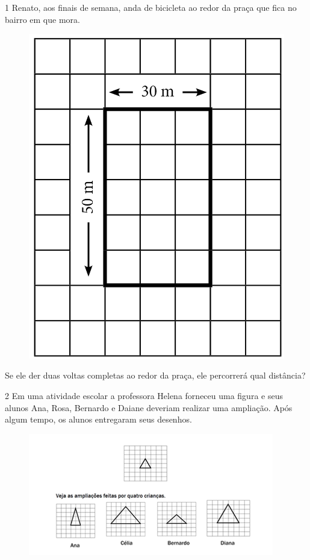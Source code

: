 
\num{1} Renato, aos finais de semana, anda de bicicleta ao redor da praça
que fica no bairro em que mora.

\begin{figure}[htpb!]
\centering
\includegraphics[width=.8\textwidth]{../ilustracoes/MAT5/SAEB_5ANO_MAT_figura35.png}
\end{figure}

Se ele der duas voltas completas ao redor da praça, ele percorrerá qual
distância?


\pagebreak

\num{2} Em uma atividade escolar a professora Helena forneceu uma figura e
seus alunos Ana, Rosa, Bernardo e Daiane deveriam realizar uma ampliação. Após algum tempo, os alunos entregaram seus desenhos.

\begin{figure}[htpb!]
\centering
\includegraphics[width=\textwidth]{./imgs/mat5.png}
\end{figure}


